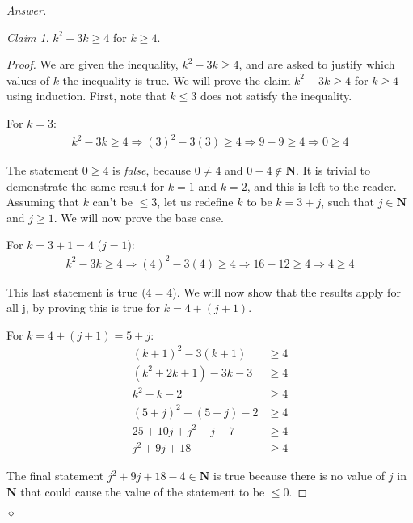 \documentclass[12pt,oneside]{amsart}
\theoremstyle{remark}
\newtheorem{claim}{Claim}[exer]
\newcommand{\bfN}{\mathbf{N}}
\newenvironment{answer}{\bigskip\noindent\emph{Answer.}}{\hfill$\diamond$\newline}
\begin{document}
\begin{answer}
\begin{claim}
$k^2 - 3k \geq 4$ for $k \geq 4$.
\end{claim}

\begin{proof}
We are given the inequality, $k^2 - 3k \geq 4$, and are asked to justify which values of $k$ the inequality is true. We will prove the claim $k^2 - 3k \geq 4$ for $k \geq 4$ using induction. First, note that $k \leq 3$ does not satisfy the inequality.

For $k = 3$:
\begin{align*}
    k^2 - 3k \geq 4 \Rightarrow
(3)^2 - 3(3) \geq 4 \Rightarrow
       9 - 9 \geq 4 \Rightarrow
           0 \geq 4
\end{align*}

The statement $0 \geq 4$ is \emph{false}, because $0 \neq 4$ and $0 - 4 \notin \bfN$. It is trivial to demonstrate the same result for $k = 1$ and $k = 2$, and this is left to the reader. Assuming that $k$ can't be $\leq 3$, let us redefine $k$ to be $k = 3 + j$, such that $j \in \bfN$ and $j \geq 1$. We will now prove the base case.

For $k = 3 + 1 = 4$ ($j = 1$):
\begin{align*}
    k^2 - 3k \geq 4 \Rightarrow
(4)^2 - 3(4) \geq 4 \Rightarrow
     16 - 12 \geq 4 \Rightarrow
           4 \geq 4
\end{align*}

This last statement is true ($4 = 4$). We will now show that the results apply for all j, by proving this is true for $k = 4 + (j + 1)$.

For $k = 4 + (j + 1) = 5 + j$:
\begin{align*}
   (k + 1)^2 - 3(k + 1) &\geq 4 \\
(k^2 + 2k + 1) - 3k - 3 &\geq 4 \\
            k^2 - k - 2 &\geq 4 \\
(5 + j)^2 - (5 + j) - 2 &\geq 4 \\
 25 + 10j + j^2 - j - 7 &\geq 4 \\
          j^2 + 9j + 18 &\geq 4
\end{align*}

The final statement $j^2 + 9j + 18 - 4 \in \bfN$ is true because there is no value of $j$ in $\bfN$ that could cause the value of the statement to be $\leq 0$.
\end{proof}
\end{answer}
\end{document}
